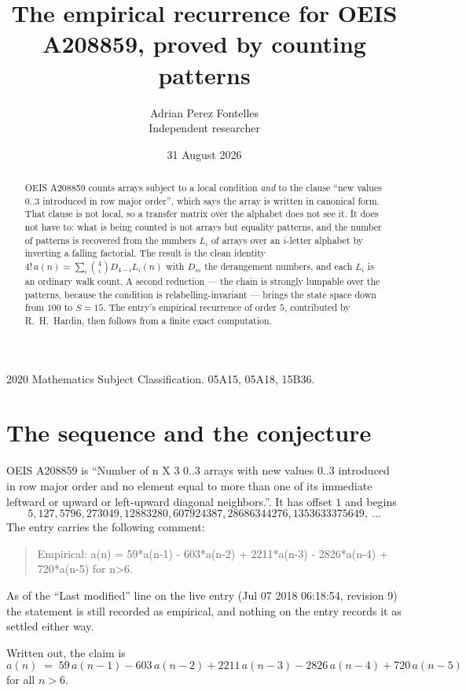 \documentclass[11pt,a4paper]{article}
\title{The empirical recurrence for OEIS A208859, proved by counting patterns}
\author{Adrian Perez Fontelles\\ \small Independent researcher}
\date{31 August 2026}
\theoremstyle{plain}
\theoremstyle{definition}
\begin{document}
\maketitle

\begin{abstract}
OEIS A208859 counts arrays subject to a local condition \emph{and} to the clause ``new values
$0..3$ introduced in row major order'', which says the array is written in canonical
form. That clause is not local, so a transfer matrix over the alphabet does not see it. It
does not have to: what is being counted is not arrays but equality patterns, and the number
of patterns is recovered from the numbers $L_i$ of arrays over an $i$-letter alphabet by
inverting a falling factorial. The result is the clean identity
$4!\,a(n)=\sum_i\binom{4}{i}D_{4-i}L_i(n)$ with $D_m$ the derangement numbers,
and each $L_i$ is an ordinary walk count. A second reduction --- the chain is strongly
lumpable over the patterns, because the condition is relabelling-invariant --- brings the
state space down from $100$ to $S=15$. The entry's empirical recurrence of order
$5$, contributed by R.~H.~Hardin, then follows from a finite exact computation.
\end{abstract}

\noindent\small 2020 Mathematics Subject Classification. 05A15, 05A18, 15B36.\normalsize

\section{The sequence and the conjecture}

OEIS A208859 is ``Number of n X 3 0..3 arrays with new values 0..3 introduced in row major order and no element equal to more than one of its immediate leftward or upward or left-upward diagonal neighbors.''. It has offset $1$ and begins
\[
5, 127, 5796, 273049, 12883280, 607924387, 28686344276, 1353633375649,\ \dots
\]
The entry carries the following comment:
\begin{quote}\small
Empirical: a(n) = 59*a(n-1) - 603*a(n-2) + 2211*a(n-3) - 2826*a(n-4) + 720*a(n-5) for n>6.
\end{quote}
As of the ``Last modified'' line on the live entry (Jul 07 2018 06:18:54, revision 9) the statement is
still recorded as empirical, and nothing on the entry records it as settled either way.

Written out, the claim is
\begin{equation}\label{eq:conj}
a(n)\;=\;59\,a(n-1) - 603\,a(n-2) + 2211\,a(n-3) - 2826\,a(n-4) + 720\,a(n-5)
\end{equation}
for all $n>6$.
\end{document}

